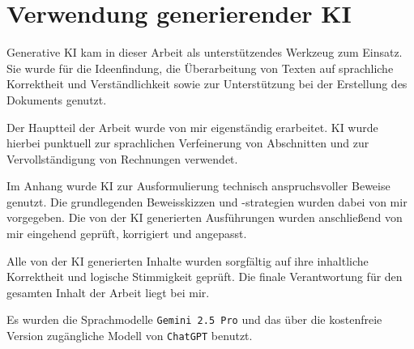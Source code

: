 \documentclass[../../main.tex]{subfiles}
\begin{document}
\chapter*{Verwendung generierender KI}
Generative KI kam in dieser Arbeit als unterstützendes Werkzeug zum Einsatz. Sie wurde für die Ideenfindung, die Überarbeitung von Texten auf sprachliche Korrektheit und Verständlichkeit sowie zur Unterstützung bei der Erstellung des Dokuments genutzt.

Der Hauptteil der Arbeit wurde von mir eigenständig erarbeitet. KI wurde hierbei punktuell zur sprachlichen Verfeinerung von Abschnitten und zur Vervollständigung von Rechnungen verwendet.

Im Anhang wurde KI zur Ausformulierung technisch anspruchsvoller Beweise genutzt. Die grundlegenden Beweisskizzen und -strategien wurden dabei von mir vorgegeben. Die von der KI generierten Ausführungen wurden anschließend von mir eingehend geprüft, korrigiert und angepasst.

Alle von der KI generierten Inhalte wurden sorgfältig auf ihre inhaltliche Korrektheit und logische Stimmigkeit geprüft. Die finale Verantwortung für den gesamten Inhalt der Arbeit liegt bei mir.

Es wurden die Sprachmodelle \texttt{Gemini 2.5 Pro} und das über die kostenfreie Version zugängliche Modell von \texttt{ChatGPT} benutzt.
\end{document}
